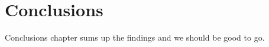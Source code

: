 \chapter{Conclusions}
\label{chapter:conclusions}

Conclusions chapter sums up the findings and we should be good to go.
